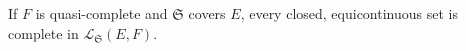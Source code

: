 If $F$ is quasi-complete and $\mathfrak{S}$ covers $E$, every closed, equicontinuous set is complete in $\mathcal{L}_{\mathfrak{S}}(E, F)$.
